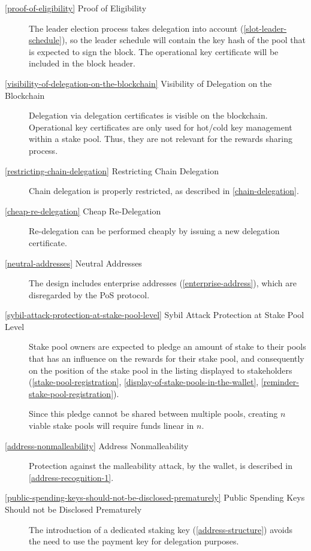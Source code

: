 \documentclass[11pt,a4paper,dvipsnames,twosided]{article}
\begin{document}
\begin{description}

\item[\cref{proof-of-eligibility} Proof of Eligibility] The leader election
  process takes delegation into account (\cref{slot-leader-schedule}), so the
  leader schedule will contain the key hash of the pool that is expected to sign
  the block. The operational key certificate will be included in the block
  header.

\item[\cref{visibility-of-delegation-on-the-blockchain} Visibility of Delegation
  on the Blockchain] Delegation via delegation certificates is visible on the
  blockchain. Operational key certificates are only used for hot/cold key
  management within a stake pool. Thus, they are not relevant for the rewards
  sharing process.

\item[\cref{restricting-chain-delegation} Restricting Chain
  Delegation] Chain delegation is properly restricted, as described in
  \cref{chain-delegation}.

\item[\cref{cheap-re-delegation} Cheap Re-Delegation] Re-delegation can
  be performed cheaply by issuing a new delegation certificate.

\item[\cref{neutral-addresses} Neutral Addresses] The design includes
  enterprise addresses (\cref{enterprise-address}), which are
  disregarded by the PoS protocol.

\item[\cref{sybil-attack-protection-at-stake-pool-level} Sybil Attack
  Protection at Stake Pool Level] Stake pool owners are expected to
  pledge an amount of stake to their pools that has an influence on
  the rewards for their stake pool, and consequently on the
  position of the stake pool in the listing displayed to stakeholders
  (\cref{stake-pool-registration},
  \cref{display-of-stake-pools-in-the-wallet},
  \cref{reminder-stake-pool-registration}).

  Since this pledge cannot be shared between multiple pools, creating
  $n$ viable stake pools will require funds linear in $n$.

\item[\cref{address-nonmalleability} Address Nonmalleability] Protection against
  the malleability attack, by the wallet, is described in
  \cref{address-recognition-1}.

\item[\cref{public-spending-keys-should-not-be-disclosed-prematurely}
  Public Spending Keys Should not be Disclosed Prematurely] The
  introduction of a dedicated staking key (\cref{address-structure})
  avoids the need to use the payment key for delegation purposes.


\end{description}
\end{document}
